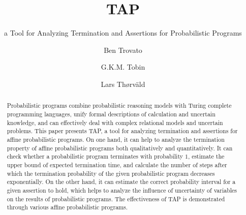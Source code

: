 \documentclass[sigconf,review, anonymous]{acmart}
\begin{document}
\title{TAP}
\subtitle{a Tool for Analyzing Termination and Assertions for Probabilistic Programs}


\author{Ben Trovato}

\author{G.K.M. Tobin}

\author{Lars Th{\o}rv{\"a}ld}

\renewcommand{\shortauthors}{B. Trovato et al.}


\begin{abstract}
  Probabilistic programs combine probabilistic reasoning models with Turing complete programming languages, unify formal descriptions of calculation and uncertain knowledge, and can effectively deal with complex relational models and uncertain problems. This paper presents TAP, a tool for analyzing termination and assertions for affine probabilistic programs. On one hand, it can help to analyze the termination property of affine probabilistic programs both qualitatively and quantitatively. It can check whether a probabilistic program terminates with probability $1$, estimate the upper bound of expected termination time, and calculate the number of steps after which the termination probability of the given probabilistic program decreases exponentially.  On the other hand, it can estimate the correct probability interval for a given assertion to hold, which helps to analyze the influence of uncertainty of variables on the results of probabilistic programs.
  The effectiveness of TAP is demonstrated through various affine probabilistic programs.
\end{abstract}
\end{document}
